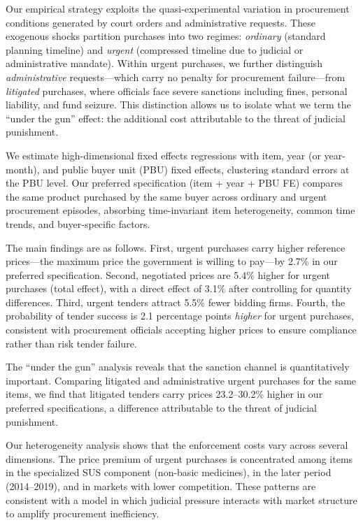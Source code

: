 Our empirical strategy exploits the quasi-experimental variation in procurement conditions generated by court orders and administrative requests. These exogenous shocks partition purchases into two regimes: \textit{ordinary} (standard planning timeline) and \textit{urgent} (compressed timeline due to judicial or administrative mandate). Within urgent purchases, we further distinguish \textit{administrative} requests---which carry no penalty for procurement failure---from \textit{litigated} purchases, where officials face severe sanctions including fines, personal liability, and fund seizure. This distinction allows us to isolate what we term the ``under the gun'' effect: the additional cost attributable to the threat of judicial punishment.

We estimate high-dimensional fixed effects regressions with item, year (or year-month), and public buyer unit (PBU) fixed effects, clustering standard errors at the PBU level. Our preferred specification (item + year + PBU FE) compares the same product purchased by the same buyer across ordinary and urgent procurement episodes, absorbing time-invariant item heterogeneity, common time trends, and buyer-specific factors.

The main findings are as follows. First, urgent purchases carry higher reference prices---the maximum price the government is willing to pay---by 2.7\% in our preferred specification. Second, negotiated prices are 5.4\% higher for urgent purchases (total effect), with a direct effect of 3.1\% after controlling for quantity differences. Third, urgent tenders attract 5.5\% fewer bidding firms. Fourth, the probability of tender success is 2.1 percentage points \textit{higher} for urgent purchases, consistent with procurement officials accepting higher prices to ensure compliance rather than risk tender failure.

The ``under the gun'' analysis reveals that the sanction channel is quantitatively important. Comparing litigated and administrative urgent purchases for the same items, we find that litigated tenders carry prices 23.2--30.2\% higher in our preferred specifications, a difference attributable to the threat of judicial punishment.

Our heterogeneity analysis shows that the enforcement costs vary across several dimensions. The price premium of urgent purchases is concentrated among items in the specialized SUS component (non-basic medicines), in the later period (2014--2019), and in markets with lower competition. These patterns are consistent with a model in which judicial pressure interacts with market structure to amplify procurement inefficiency.

